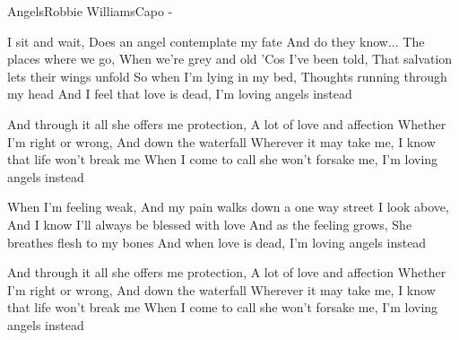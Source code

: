 \begin{song}{Angels}{Robbie Williams}{Capo - }

I sit and wait, Does an angel contemplate my fate
And do they know... The places where we go, When we're grey and old
'Cos I've been told, That salvation lets their wings unfold
So when I'm lying in my bed, Thoughts running through my head
And I feel that love is dead, I'm loving angels instead

And through it all she offers me protection, A lot of love and affection
Whether I'm right or wrong, And down the waterfall
Wherever it may take me, I know that life won't break me
When I come to call she won't forsake me, I'm loving angels instead

When I'm feeling weak, And my pain walks down a one way street
I look above, And I know I'll always be blessed with love
And as the feeling grows, She breathes flesh to my bones
And when love is dead, I'm loving angels instead

And through it all she offers me protection, A lot of love and affection
Whether I'm right or wrong, And down the waterfall
Wherever it may take me, I know that life won't break me
When I come to call she won't forsake me, I'm loving angels instead




\end{song}
